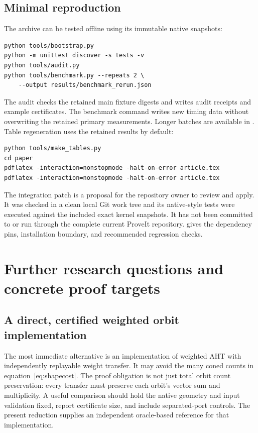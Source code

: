 \documentclass[11pt,letterpaper]{article}
\theoremstyle{definition}\newtheorem{definition}[theorem]{Definition}
\theoremstyle{remark}\newtheorem{remark}[theorem]{Remark}
\begin{document}
\subsection{Minimal reproduction}

The archive can be tested offline using its immutable native snapshots:
\begin{lstlisting}
python tools/bootstrap.py
python -m unittest discover -s tests -v
python tools/audit.py
python tools/benchmark.py --repeats 2 \
    --output results/benchmark_rerun.json
\end{lstlisting}
The audit checks the retained main fixture digests and writes audit receipts and example certificates. The benchmark command writes new timing data without overwriting the retained primary measurements. Longer batches are available in . Table regeneration uses the retained results by default:
\begin{lstlisting}
python tools/make_tables.py
cd paper
pdflatex -interaction=nonstopmode -halt-on-error article.tex
pdflatex -interaction=nonstopmode -halt-on-error article.tex
\end{lstlisting}

The integration patch is a proposal for the repository owner to review and apply. It was checked in a clean local Git work tree and its native-style tests were executed against the included exact kernel snapshots. It has not been committed to or run through the complete current ProveIt repository.  gives the dependency pins, installation boundary, and recommended regression checks.

\section{Further research questions and concrete proof targets}
\label{sec:future}

\subsection{A direct, certified weighted orbit implementation}
The most immediate alternative is an implementation of weighted AHT with independently replayable weight transfer. It may avoid the many coned counts in equation~\eqref{eq:shapecost}. The proof obligation is not just total orbit count preservation: every transfer must preserve each orbit's vector sum and multiplicity. A useful comparison should hold the native geometry and input validation fixed, report certificate size, and include separated-port controls. The present reduction supplies an independent oracle-based reference for that implementation.
\end{document}
